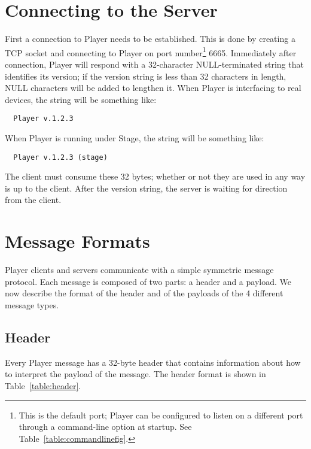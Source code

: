 \documentclass[11pt]{report}
\def\DEFAULTPORT {6665}
\begin{document}
\section{Connecting to the Server}
First a connection to Player needs to be established. This is done
by creating a TCP socket and connecting to Player on port number\footnote{This 
is the default port; Player can be configured to listen on 
a different port through a command-line option at startup.  See 
Table~\ref{table:commandlinefig}.} \DEFAULTPORT.  Immediately after connection,
Player will respond with a 32-character NULL-terminated string that identifies
its version; if the version string is less than 32 characters in length,
NULL characters will be added to lengthen it.  When Player is interfacing to
real devices, the string will be something like:
\begin{verbatim}
  Player v.1.2.3
\end{verbatim}
When Player is running under Stage, the string will be something like:
\begin{verbatim}
  Player v.1.2.3 (stage)
\end{verbatim}
The client must consume these 32 bytes; whether or not they are used in any
way is up to the client.  After the version string, the server is waiting
for direction from the client.

\section{Message Formats}
\label{sect:messageformat}
Player clients and servers communicate with a simple symmetric message
protocol.  Each message is composed of two parts: a header and a payload.
We now describe the format of the header and of the payloads of
the 4 different message types.

\subsection{Header}
Every Player message has a 32-byte header that contains information
about how to interpret the payload of the message.  The header format
is shown in Table~\ref{table:header}.
\end{document}
